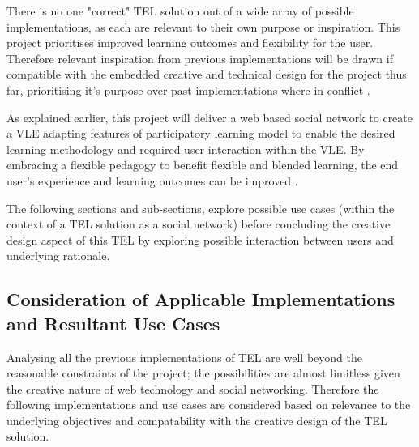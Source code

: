 There is no one "correct" TEL solution out of a wide array of possible implementations, as each are relevant to their own purpose or inspiration. This project  prioritises improved learning outcomes and flexibility for the user. Therefore relevant inspiration from previous implementations will be drawn if compatible with the embedded creative and technical design for the project thus far, prioritising it's purpose over past implementations where in conflict \cite{Burge2011}.

As explained earlier, this project will deliver a web based social network to create a VLE \cite{Gordon2014,Burge2011} adapting features of  participatory learning model \cite{Yager1990,Yager2004} to enable the desired learning methodology and required user interaction within the VLE. By embracing a flexible pedagogy to benefit flexible  and blended learning, the end user's experience and learning outcomes can be improved \cite{Gordon2014,Burge2011}.

The following sections and sub-sections, explore possible use cases (within the context of a TEL solution as a social network) before concluding the creative design aspect of this TEL by exploring possible interaction between users and underlying rationale.


\subsection{Consideration of Applicable Implementations and Resultant Use Cases}
\label{subsec:subsec01}


Analysing all the previous implementations of TEL are well beyond the reasonable constraints of the project; the possibilities are almost limitless given the creative nature of web technology and social networking. Therefore the following implementations and use cases are considered based on relevance to the underlying objectives and compatability with the creative design of the TEL solution.


